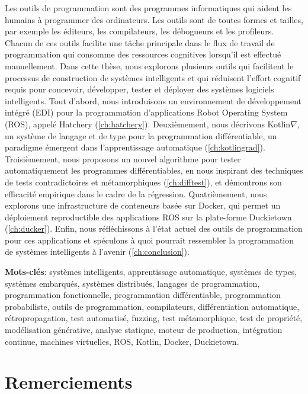 \vspace{-40pt} Les outils de programmation sont des programmes informatiques qui aident les humains à programmer des ordinateurs. Les outils sont de toutes formes et tailles, par exemple les éditeurs, les compilateurs, les débogueurs et les profileurs. Chacun de ces outils facilite une t\^ache principale dans le flux de travail de programmation qui consomme des ressources cognitives lorsqu'il est effectué manuellement. Dans cette thèse, nous explorons plusieurs outils qui facilitent le processus de construction de systèmes intelligents et qui réduisent l'effort cognitif requis pour concevoir, développer, tester et déployer des systèmes logiciels intelligents. Tout d'abord, nous introduisons un environnement de développement intégré (EDI) pour la programmation d'applications Robot Operating System (ROS), appelé Hatchery (\autoref{ch:hatchery}). Deuxièmement, nous décrivons Kotlin$\nabla$, un système de langage et de type pour la programmation différentiable, un paradigme émergent dans l'apprentissage automatique (\autoref{ch:kotlingrad}). Troisièmement, nous proposons un nouvel algorithme pour tester automatiquement les programmes différentiables, en nous inspirant des techniques de tests contradictoires et métamorphiques (\autoref{ch:difftest}), et démontrons son efficacité empirique dans le cadre de la régression. Quatrièmement, nous explorons une infrastructure de conteneurs basée sur Docker, qui permet un déploiement reproductible des applications ROS sur la plate-forme Duckietown (\autoref{ch:ducker}). Enfin, nous réfléchissons à l'état actuel des outils de programmation pour ces applications et spéculons à quoi pourrait ressembler la programmation de systèmes intelligents à l'avenir (\autoref{ch:conclusion}).

\noindent\textbf{Mots-clés}: systèmes intelligents, apprentissage automatique, systèmes de types, systèmes embarqués, systèmes distribués, langages de programmation, programmation fonctionnelle, programmation différentiable, programmation probabiliste, outils de programmation, compilateurs, différentiation automatique, rétropropagation, test automatisé, fuzzing, test métamorphique, test de propriété, modélisation générative, analyse statique, moteur de production, intégration continue, machines virtuelles, ROS, Kotlin, Docker, Duckietown.

\chapter*{Remerciements}

